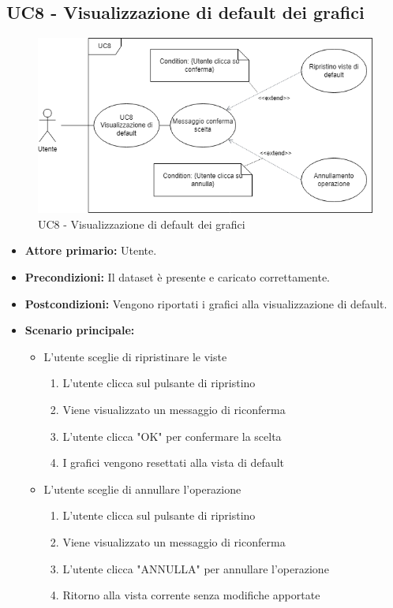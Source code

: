 \subsection{UC8 - Visualizzazione di default dei grafici}
\begin{figure}[h!]
	\centering
	\includegraphics[scale=0.80]{../../assets/visualizzazione_default.png}
	\caption{UC8 - Visualizzazione di default dei grafici}
\end{figure}
\begin{itemize}
	\item \textbf{Attore primario:} Utente.
	\item \textbf{Precondizioni:} Il dataset è presente e caricato correttamente.
	\item \textbf{Postcondizioni:} 
	Vengono riportati i grafici alla visualizzazione di default.
	\item \textbf{Scenario principale:}
	\begin{itemize}
		\item   L'utente sceglie di ripristinare le viste
	\begin{enumerate}
		\item L'utente clicca sul pulsante di ripristino
		\item Viene visualizzato un messaggio di riconferma
		\item L'utente clicca "OK" per confermare la scelta
		\item I grafici vengono resettati alla vista di default
	\end{enumerate}
		\item   L'utente sceglie di annullare l'operazione
	\begin{enumerate}
		\item L'utente clicca sul pulsante di ripristino
		\item Viene visualizzato un messaggio di riconferma
		\item L'utente clicca "ANNULLA" per annullare l'operazione
		\item Ritorno alla vista corrente senza modifiche apportate
	\end{enumerate}	
	\end{itemize}
\end{itemize}